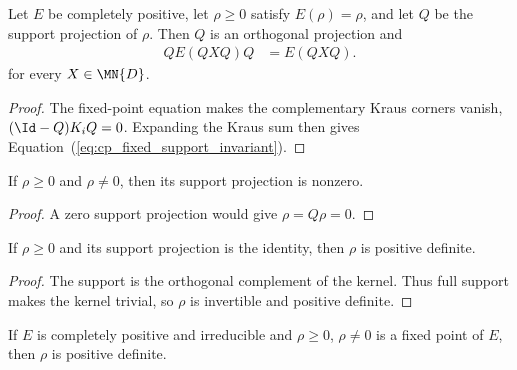 \begin{theorem}
    \label{thm:cp_fixed_support_invariant}
    \leanok
    Let $E$ be completely positive, let $\rho\geq0$ satisfy $E(\rho)=\rho$,
    and let $Q$ be the support projection of $\rho$. Then $Q$ is an
    orthogonal projection and
    \begin{align}
        QE(QXQ)Q
         & =E(QXQ).
        \label{eq:cp_fixed_support_invariant}
    \end{align}
    for every $X\in\MN{D}$.
\end{theorem}

\begin{proof}
    \leanok
    The fixed-point equation makes the complementary Kraus corners vanish,
    $(\Id-Q)K_iQ=0$. Expanding the Kraus sum then gives
    Equation~(\ref{eq:cp_fixed_support_invariant}).
\end{proof}

\begin{theorem}
    \label{thm:nonzero_psd_support}
    \leanok
    If $\rho\geq0$ and $\rho\neq0$, then its support projection is nonzero.
\end{theorem}

\begin{proof}
    \leanok
    A zero support projection would give $\rho=Q\rho=0$.
\end{proof}

\begin{theorem}
    \label{thm:full_support_posdef}
    \leanok
    If $\rho\geq0$ and its support projection is the identity, then $\rho$ is
    positive definite.
\end{theorem}

\begin{proof}
    \leanok
    The support is the orthogonal complement of the kernel. Thus full support
    makes the kernel trivial, so $\rho$ is invertible and positive definite.
\end{proof}

\begin{theorem}
    \label{thm:psd_fp_pd_irred}
    \leanok
    If $E$ is completely positive and irreducible and $\rho \ge 0$, $\rho \neq 0$
    is a fixed point of $E$, then $\rho$ is positive definite.
\end{theorem}

